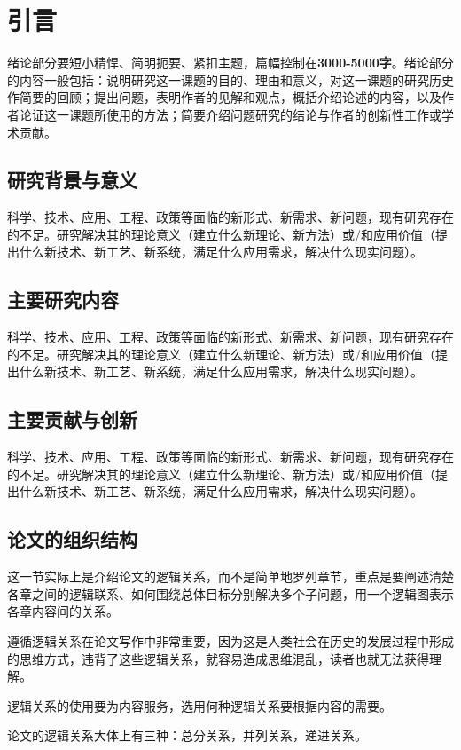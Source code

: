 
\chapter{引言}
绪论部分要短小精悍、简明扼要、紧扣主题，篇幅控制在\textbf{3000-5000字}。绪论部分的内容一般包括：说明研究这一课题的目的、理由和意义，对这一课题的研究历史作简要的回顾；提出问题，表明作者的见解和观点，概括介绍论述的内容，以及作者论证这一课题所使用的方法；简要介绍问题研究的结论与作者的创新性工作或学术贡献。


\section{研究背景与意义}
科学、技术、应用、工程、政策等面临的新形式、新需求、新问题，现有研究存在的不足。研究解决其的理论意义（建立什么新理论、新方法）或/和应用价值（提出什么新技术、新工艺、新系统，满足什么应用需求，解决什么现实问题）。

\section{主要研究内容}
科学、技术、应用、工程、政策等面临的新形式、新需求、新问题，现有研究存在的不足。研究解决其的理论意义（建立什么新理论、新方法）或/和应用价值（提出什么新技术、新工艺、新系统，满足什么应用需求，解决什么现实问题）。

\section{主要贡献与创新}
科学、技术、应用、工程、政策等面临的新形式、新需求、新问题，现有研究存在的不足。研究解决其的理论意义（建立什么新理论、新方法）或/和应用价值（提出什么新技术、新工艺、新系统，满足什么应用需求，解决什么现实问题）。

\section{论文的组织结构}
这一节实际上是介绍论文的逻辑关系，而不是简单地罗列章节，重点是要阐述清楚各章之间的逻辑联系、如何围绕总体目标分别解决多个子问题，用一个逻辑图表示各章内容间的关系。

遵循逻辑关系在论文写作中非常重要，因为这是人类社会在历史的发展过程中形成的思维方式，违背了这些逻辑关系，就容易造成思维混乱，读者也就无法获得理解。

逻辑关系的使用要为内容服务，选用何种逻辑关系要根据内容的需要。

论文的逻辑关系大体上有三种：总分关系，并列关系，递进关系。

